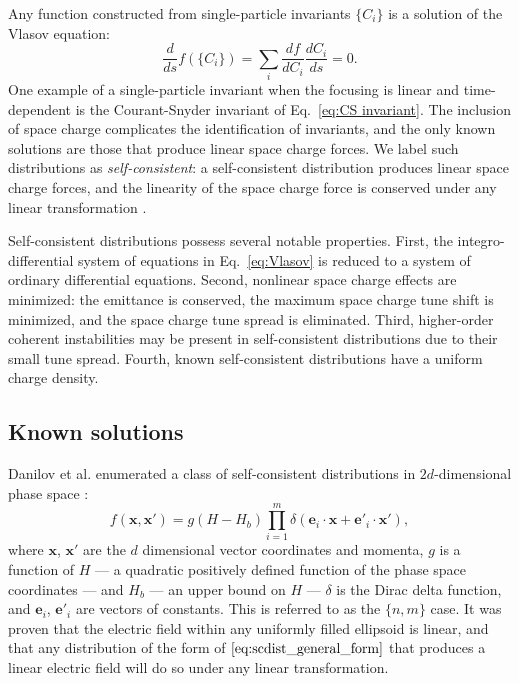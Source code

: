 Any function constructed from single-particle invariants $\{C_i\}$ is a solution of the Vlasov equation:
%
\begin{equation}\label{eq:vlasov_equilibria}
    \frac{d}{ds} f(\{C_i\}) = \sum_{i}{\frac{df}{dC_i}\frac{dC_i}{ds}} = 0.
\end{equation}
%
One example of a single-particle invariant when the focusing is linear and time-dependent is the Courant-Snyder invariant of Eq.~\eqref{eq:CS invariant}. The inclusion of space charge complicates the identification of invariants, and the only known solutions are those that produce linear space charge forces. We label such distributions as \textit{self-consistent}: a self-consistent distribution produces linear space charge forces, and the linearity of the space charge force is conserved under any linear transformation \cite{Danilov2003}. 

Self-consistent distributions possess several notable properties. First, the integro-differential system of equations in Eq.~\eqref{eq:Vlasov} is reduced to a system of ordinary differential equations. Second, nonlinear space charge effects are minimized: the emittance is conserved, the maximum space charge tune shift is minimized, and the space charge tune spread is eliminated. Third, higher-order coherent instabilities may be present in self-consistent distributions due to their small tune spread. Fourth, known self-consistent distributions have a uniform charge density.



\subsection{Known solutions}

Danilov et al. enumerated a class of self-consistent distributions in $2d$-dimensional phase space \cite{Danilov2003}: 
%
\begin{equation}\label{eq:scdist_general_form}
    f\left({\mathbf{x}, \mathbf{x}'}\right) = 
    g\left({H - H_b}\right)
    \prod_{i=1}^{m}\delta\left({\mathbf{e}_i \cdot \mathbf{x} 
    + \mathbf{e}'_i \cdot \mathbf{x}'}\right),
\end{equation}
%
where $\mathbf{x}$, $\mathbf{x}'$ are the $d$ dimensional vector coordinates and momenta, $g$ is a function of $H$ — a quadratic positively defined function of the phase space coordinates — and $H_b$ — an upper bound on $H$ — $\delta$ is the Dirac delta function, and $\mathbf{e}_i$, $\mathbf{e}'_i$ are vectors of constants. This is referred to as the $\{n,m\}$ case. It was proven that the electric field within any uniformly filled ellipsoid is linear, and that any distribution of the form of $\eqref{eq:scdist_general_form}$ that produces a linear electric field will do so under any linear transformation.

